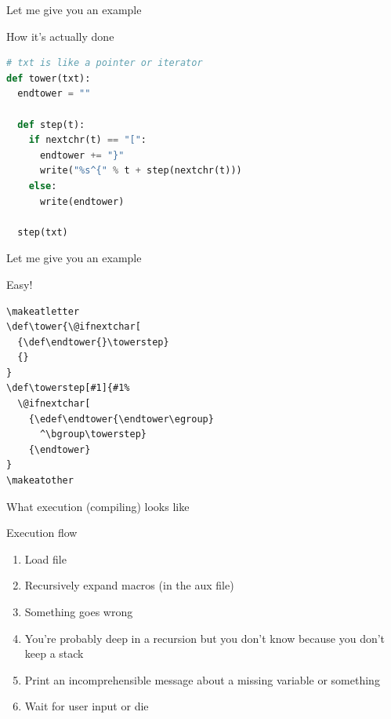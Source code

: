 \documentclass[xetex, onlymath, handout]{beamer}
\begin{document}
\begin{frame}[fragile]{Let me give you an example}
  \begin{block}{How it's actually done}
    \begin{lstlisting}[language=python]
# txt is like a pointer or iterator
def tower(txt):
  endtower = ""

  def step(t):
    if nextchr(t) == "[":
      endtower += "}"
      write("%s^{" % t + step(nextchr(t)))
    else:
      write(endtower)

  step(txt)
    \end{lstlisting}
  \end{block}
\end{frame}

\begin{frame}[fragile]{Let me give you an example}
  \begin{block}{Easy!}
    \begin{lstlisting}
\makeatletter
\def\tower{\@ifnextchar[
  {\def\endtower{}\towerstep}
  {}
}
\def\towerstep[#1]{#1%
  \@ifnextchar[
    {\edef\endtower{\endtower\egroup}
      ^\bgroup\towerstep}
    {\endtower}
}
\makeatother
    \end{lstlisting}
  \end{block}
\end{frame}

\begin{frame}{What execution (compiling) looks like}
  \begin{block}{Execution flow}
    \begin{enumerate}
      \item Load file
      \item Recursively expand macros (in the aux file)
      \item Something goes wrong
      \item You're probably deep in a recursion but you don't know because you don't keep a stack
      \item Print an incomprehensible message about a missing variable or something
      \item Wait for user input or die
    \end{enumerate}
  \end{block}
\end{frame}
\end{document}
